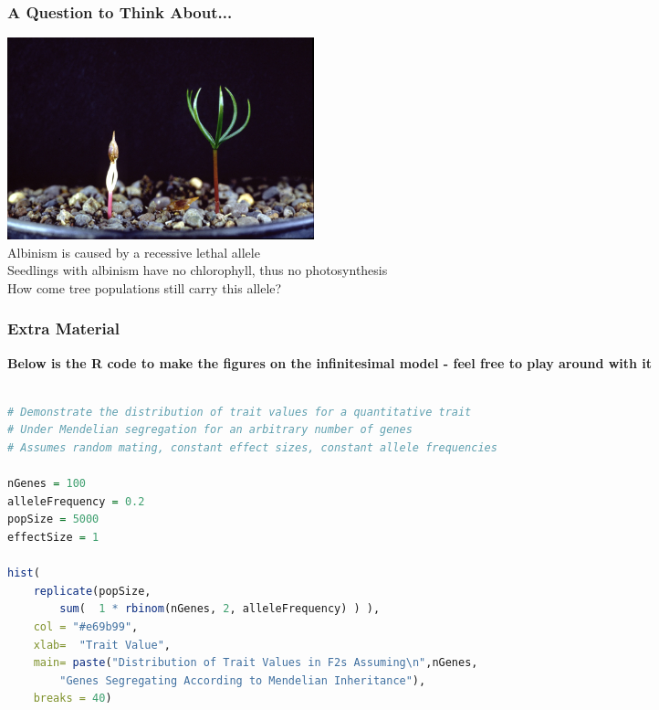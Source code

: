 \documentclass{beamer}
\begin{document}

\begin{frame}
	\frametitle{A Question to Think About...}
	\begin{center}
		\includegraphics[keepaspectratio,width=3.5in]{img/albino} \\
		Albinism is caused by a recessive lethal allele\\
		Seedlings with albinism have no chlorophyll, thus no photosynthesis\\
		How come tree populations still carry this allele? 
	\end{center}
\end{frame}

\begin{frame}[fragile]
	\frametitle{Extra Material}
	
	\textbf{Below is the R code to make the figures on the infinitesimal model - feel free to play around with it}
	\begin{adjustbox}{max width=\textwidth}
		
	\begin{lstlisting}[language=R]

# Demonstrate the distribution of trait values for a quantitative trait
# Under Mendelian segregation for an arbitrary number of genes
# Assumes random mating, constant effect sizes, constant allele frequencies
	
nGenes = 100
alleleFrequency = 0.2
popSize = 5000
effectSize = 1
			
hist( 
	replicate(popSize,
		sum(  1 * rbinom(nGenes, 2, alleleFrequency) ) ),
	col = "#e69b99",
	xlab=  "Trait Value",
	main= paste("Distribution of Trait Values in F2s Assuming\n",nGenes, 
		"Genes Segregating According to Mendelian Inheritance"),
	breaks = 40)
		\end{lstlisting}
\end{adjustbox}
\end{frame}


\end{document}
